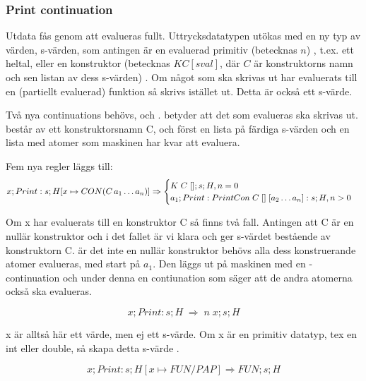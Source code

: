 \documentclass[../Core]{subfiles}
\begin{document}
\subsubsection{Print continuation}
Utdata fås genom att  evalueras fullt. %
Uttrycksdatatypen utökas med en ny typ av värden, 
s-värden, som antingen är en evaluerad primitiv (betecknas $n$)
, t.ex. ett heltal, eller en konstruktor (betecknas $K C [sval]$, där
$C$ är konstruktorns namn och sen listan av dess s-värden) .
Om något som ska skrivas ut har evaluerats till en (partiellt evaluerad)
funktion så skrivs  istället ut. Detta är också ett s-värde.





Två nya continuations behövs,  och .
 betyder att det som evalueras ska skrivas ut.  består av ett
konstruktorsnamn C, och först en lista på färdiga s-värden och en lista med
atomer som maskinen har kvar att evaluera.

Fem nya regler läggs till:
\[
x ; Print : s ; H[x \mapsto CON(C\,a_1 \ldots a_n)]
\Rightarrow \begin{cases} 
K \; C \; [] ; s ; H , n = 0 \\
a_1 ; Print : PrintCon \; C \; [] \; [a_2 \ldots a_n] : s ; H , n > 0
\end{cases}
\]

Om x har evaluerats till en konstruktor C så finns två fall. Antingen att C är
en nullär konstruktor och i det fallet är vi klara och ger s-värdet bestående
av konstruktorn C.
    är det inte en nullär konstruktor behövs alla dess konstruerande atomer
evalueras, med start på $a_1$. Den läggs ut på maskinen med en -continuation
och under denna en contiunation som säger att de andra atomerna också ska
evalueras.
 

\[
x ; Print : s ; H \;
\Rightarrow \; n \; x ; s ; H
\]

x är alltså här ett värde, men ej ett s-värde.
Om x är en primitiv datatyp, tex en int eller double, så skapa detta s-värde
.


\[
x ; Print : s ; H[x \mapsto FUN / PAP]
\Rightarrow FUN ; s ; H
\]
\end{document}
